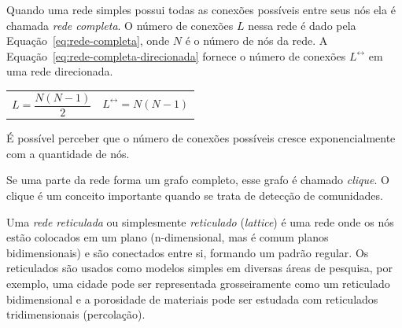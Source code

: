 \documentclass[12pt,a4paper,final]{article}
\newcommand{\linkboth}[1]{#1^\leftrightarrow} %
\begin{document}
Quando uma rede simples possui todas as conexões possíveis entre seus nós ela é chamada \textit{rede completa}. O número de conexões $L$ nessa rede é dado pela Equação~\ref{eq:rede-completa}, onde $N$ é o número de nós da rede. A Equação~\ref{eq:rede-completa-direcionada} fornece o número de conexões $\linkboth{L}$ em uma rede direcionada.

\noindent
\begin{tabularx}{\linewidth}{@{}XX@{}}
    \begin{equation} \label{eq:rede-completa}
    L = \frac{N(N - 1)}{2}
    \end{equation} &
    \begin{equation} \label{eq:rede-completa-direcionada}
    \linkboth{L} = N(N - 1)
    \end{equation}
\end{tabularx}

É possível perceber que o número de conexões possíveis cresce exponencialmente com a quantidade de nós.

Se uma parte da rede forma um grafo completo, esse grafo é chamado \textit{clique}. O clique é um conceito importante quando se trata de detecção de comunidades.

Uma \textit{rede reticulada} ou simplesmente \textit{reticulado} (\textit{lattice}) é uma rede onde os nós estão colocados em um plano (n-dimensional, mas é comum planos bidimensionais) e são conectados entre si, formando um padrão regular. Os reticulados são usados como modelos simples em diversas áreas de pesquisa, por exemplo, uma cidade pode ser representada grosseiramente como um reticulado bidimensional e a porosidade de materiais pode ser estudada com reticulados tridimensionais (percolação).
\end{document}
